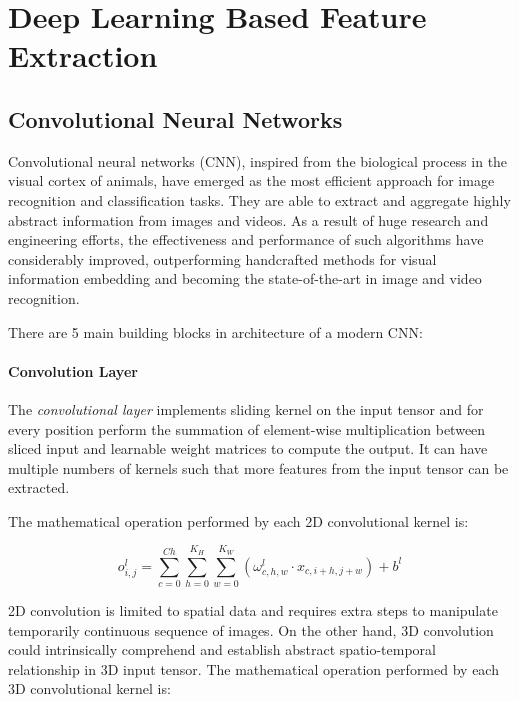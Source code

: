 
\section{Deep Learning Based Feature Extraction}

    \subsection{Convolutional Neural Networks}
        Convolutional neural networks (CNN), inspired from the biological process in the visual cortex of animals, have emerged as the most efficient approach for image recognition and classification tasks.
        They are able to extract and aggregate highly abstract information from images and videos.
        As a result of huge research and engineering efforts, the effectiveness and performance of such algorithms have considerably improved, outperforming handcrafted methods for visual information embedding and becoming the state-of-the-art in image and video recognition.

        There are 5 main building blocks in architecture of a modern CNN:

        \paragraph{Convolution Layer}
            The \textit{convolutional layer} implements sliding kernel on the input tensor and for every position perform the summation of element-wise multiplication between sliced input and learnable weight matrices to compute the output.
            It can have multiple numbers of kernels such that more features from the input tensor can be extracted.

            The mathematical operation performed by each 2D convolutional kernel is:

            \begin{equation}
                o_{i,j}^l = \sum_{c=0}^{Ch}\sum_{h=0}^{K_H}\sum_{w=0}^{K_W}\left(\omega_{c,h,w}^l \cdot x_{c,i+h,j+w}\right) + b^l
            \end{equation}

            2D convolution is limited to spatial data and requires extra steps to manipulate temporarily continuous sequence of images.
            On the other hand, 3D convolution could intrinsically comprehend and establish abstract spatio-temporal relationship in 3D input tensor.
            The mathematical operation performed by each 3D convolutional kernel is:


